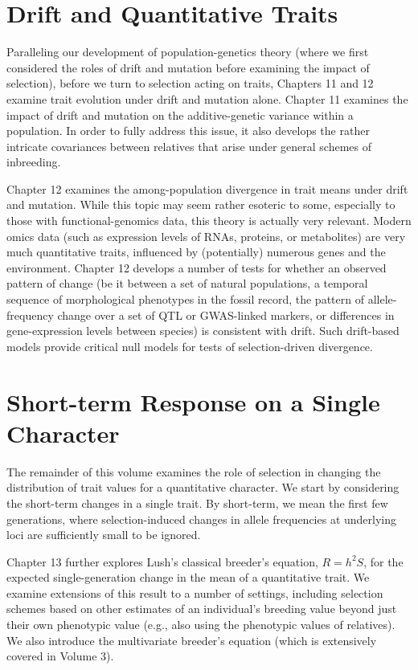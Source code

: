 \documentclass{article}
\begin{document}
\section{Drift and Quantitative Traits}
Paralleling our development of population-genetics theory (where we first considered the roles of drift and mutation before examining the impact of selection), before we turn to selection acting on traits, Chapters 11 and 12 examine trait evolution under drift and mutation alone. Chapter 11 examines the impact of drift and mutation on the additive-genetic variance within a population. In order to fully address this issue, it also develops the rather intricate covariances between relatives that arise under general schemes of inbreeding.

Chapter 12 examines the among-population divergence in trait means under drift and mutation. While this topic may seem rather esoteric to some, especially to those with functional-genomics data, this theory is actually very relevant. Modern omics data (such as expression levels of RNAs, proteins, or metabolites) are very much quantitative traits, influenced by (potentially) numerous genes and the environment. Chapter 12 develops a number of tests for whether an observed pattern of change (be it between a set of natural populations, a temporal sequence of morphological phenotypes in the fossil record, the pattern of allele-frequency change over a set of QTL or GWAS-linked markers, or differences in gene-expression levels between species) is consistent with drift. Such drift-based models provide critical null models for tests of selection-driven divergence.

\section{Short-term Response on a Single Character}
The remainder of this volume examines the role of selection in changing the distribution of trait values for a quantitative character. We start by considering the short-term changes in a single trait. By short-term, we mean the first few generations, where selection-induced changes in allele frequencies at underlying loci are sufficiently small to be ignored.

Chapter 13 further explores Lush’s classical breeder’s equation,  $ R = h^2 S $, for the expected single-generation change in the mean of a quantitative trait. We examine extensions of this result to a number of settings, including selection schemes based on other estimates of an individual’s breeding value beyond just their own phenotypic value (e.g., also using the phenotypic values of relatives). We also introduce the multivariate breeder’s equation (which is extensively covered in Volume 3).
\end{document}
